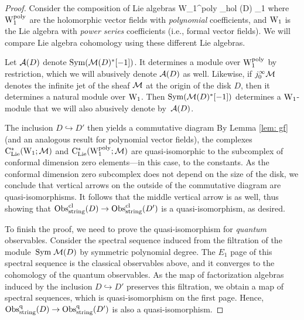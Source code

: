 \begin{proof}
Consider the composition of Lie algebras
\ben
{\rm W}_1^{\rm poly} \hookrightarrow \cT_{hol} (D) _1
\een
where ${\rm W}_1^{\rm poly}$ are the holomorphic vector fields with {\em polynomial} coefficients, and ${\rm W}_1$ is the Lie algebra with {\em power series} coefficients (i.e., formal vector fields).
We will compare Lie algebra cohomology using these different Lie algebras.

Let $\mathcal{A}(D)$ denote ${\rm Sym}(\mathcal M(D)^*[-1])$.
It determines a module over ${\rm W}_1^{\rm poly}$ by restriction,
which we will abusively denote $\mathcal{A}(D)$ as well.
Likewise, if $j_0^\infty \mathcal M$ denotes the infinite jet of the sheaf $\mathcal M$ at the origin of the disk $D$,
then it determines a natural module over ${\rm W}_1$.
Then ${\rm Sym}(\mathcal M(D)^*[-1])$ determines a ${\rm W}_1$-module that we will also abusively denote by~$\mathcal{A}(D)$.
 
The inclusion $D \hookrightarrow D'$ then yields a commutative diagram
\ben
{}
\een
By Lemma \ref{lem: gf} (and an analogous result for polynomial vector fields),
the complexes ${\rm C}_{{\rm Lie}}^*({\rm W}_1 ; \mathcal M)$ and ${\rm C}_{{\rm Lie}}^*({\rm W}^{\rm poly}_1; \mathcal M)$ are quasi-isomorphic to the subcomplex of conformal dimension zero elements---in this case, to the constants. 
As the conformal dimension zero subcomplex does not depend on the size of the disk, we conclude that vertical arrows on the outside of the commutative diagram are quasi-isomorphisms. 
It follows that the middle vertical arrow is as well, 
thus showing that ${\rm Obs}^{{\rm cl}}_{\rm string}(D) \to {\rm Obs}^{{\rm cl}}_{\rm string}(D')$ is a quasi-isomorphism, as desired. 

To finish the proof, we need to prove the quasi-isomorphism for {\em quantum} observables.
Consider the spectral sequence induced from the filtration of the module~${\rm Sym} \;\mathcal M(D)$ by symmetric polynomial degree. 
The $E_1$ page of this spectral sequence is the classical observables above, 
and it converges to the cohomology of the quantum observables. 
As the map of factorization algebras induced by the inclusion $D \hookrightarrow D'$ preserves this filtration, 
we obtain a map of spectral sequences,
which is quasi-isomorphism on the first page.
Hence, ${\rm Obs}^{{\rm q}}_{\rm string}(D) \to {\rm Obs}^{\rm q}_{\rm string}(D')$ is also a quasi-isomorphism. 
\end{proof}


